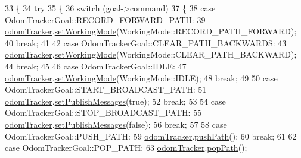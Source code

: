 \begin{DoxyCode}
33   \{
34     \textcolor{keywordflow}{try}
35     \{
36       \textcolor{keywordflow}{switch} (goal->command)
37       \{
38       \textcolor{keywordflow}{case} OdomTrackerGoal::RECORD\_FORWARD\_PATH:
39         \hyperlink{classOdomTrackerActionServer_a3e5c4328d3206fbd2fd2708f0aefe651}{odomTracker}.\hyperlink{classmove__base__z__client_1_1odom__tracker_1_1OdomTracker_aebeb8ff6d1f9375d855def4a33b90731}{setWorkingMode}(WorkingMode::RECORD\_PATH\_FORWARD);
40         \textcolor{keywordflow}{break};
41 
42       \textcolor{keywordflow}{case} OdomTrackerGoal::CLEAR\_PATH\_BACKWARDS:
43         \hyperlink{classOdomTrackerActionServer_a3e5c4328d3206fbd2fd2708f0aefe651}{odomTracker}.\hyperlink{classmove__base__z__client_1_1odom__tracker_1_1OdomTracker_aebeb8ff6d1f9375d855def4a33b90731}{setWorkingMode}(WorkingMode::CLEAR\_PATH\_BACKWARD);
44         \textcolor{keywordflow}{break};
45 
46       \textcolor{keywordflow}{case} OdomTrackerGoal::IDLE:
47         \hyperlink{classOdomTrackerActionServer_a3e5c4328d3206fbd2fd2708f0aefe651}{odomTracker}.\hyperlink{classmove__base__z__client_1_1odom__tracker_1_1OdomTracker_aebeb8ff6d1f9375d855def4a33b90731}{setWorkingMode}(WorkingMode::IDLE);
48         \textcolor{keywordflow}{break};
49 
50       \textcolor{keywordflow}{case} OdomTrackerGoal::START\_BROADCAST\_PATH:
51         \hyperlink{classOdomTrackerActionServer_a3e5c4328d3206fbd2fd2708f0aefe651}{odomTracker}.\hyperlink{classmove__base__z__client_1_1odom__tracker_1_1OdomTracker_af567cbb995d224a9737ec9080c7d0f09}{setPublishMessages}(\textcolor{keyword}{true});
52         \textcolor{keywordflow}{break};
53 
54       \textcolor{keywordflow}{case} OdomTrackerGoal::STOP\_BROADCAST\_PATH:
55         \hyperlink{classOdomTrackerActionServer_a3e5c4328d3206fbd2fd2708f0aefe651}{odomTracker}.\hyperlink{classmove__base__z__client_1_1odom__tracker_1_1OdomTracker_af567cbb995d224a9737ec9080c7d0f09}{setPublishMessages}(\textcolor{keyword}{false});
56         \textcolor{keywordflow}{break};
57 
58       \textcolor{keywordflow}{case} OdomTrackerGoal::PUSH\_PATH:
59         \hyperlink{classOdomTrackerActionServer_a3e5c4328d3206fbd2fd2708f0aefe651}{odomTracker}.\hyperlink{classmove__base__z__client_1_1odom__tracker_1_1OdomTracker_a2166488c9e1cd0fb94fdd963bca80ece}{pushPath}();
60         \textcolor{keywordflow}{break};
61 
62       \textcolor{keywordflow}{case} OdomTrackerGoal::POP\_PATH:
63         \hyperlink{classOdomTrackerActionServer_a3e5c4328d3206fbd2fd2708f0aefe651}{odomTracker}.\hyperlink{classmove__base__z__client_1_1odom__tracker_1_1OdomTracker_ad7bc705c10a84b14df4e7d937e4e5f7e}{popPath}();

\end{DoxyCode}
